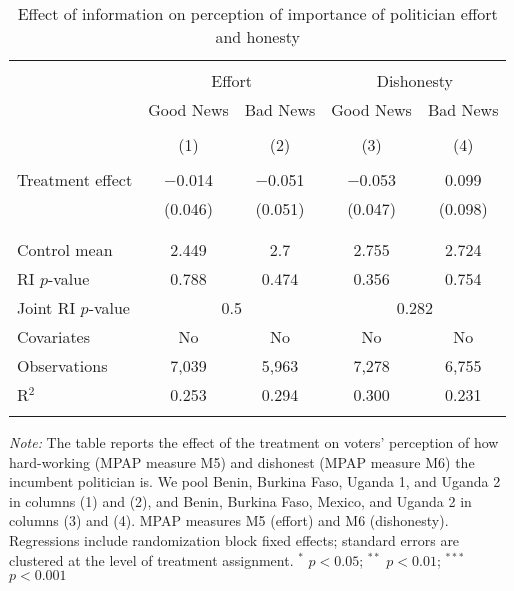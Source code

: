 
\begin{table}[!htbp] \centering 
  \caption{Effect of information on perception of importance of politician effort and honesty} 
  \label{effort_honesty} 
\begin{tabular}{@{\extracolsep{1pt}}lcccc} 
\\[-1.8ex]\hline 
\hline \\[-1.8ex] 
 & \multicolumn{2}{c}{Effort}&\multicolumn{2}{c}{Dishonesty} \\ 
\cline{2-5} 
 & Good News & Bad News & Good News & Bad News \\ 
\\[-1.8ex] & (1) & (2) & (3) & (4)\\ 
\hline \\[-1.8ex] 
 Treatment effect & $-$0.014 & $-$0.051 & $-$0.053 & 0.099 \\ 
  & (0.046) & (0.051) & (0.047) & (0.098) \\ 
  & & & & \\ 
\hline \\[-1.8ex] 
Control mean & 2.449 & 2.7 & 2.755 & 2.724 \\ 
RI $p$-value & 0.788 & 0.474 & 0.356 & 0.754 \\ 
Joint RI $p$-value & \multicolumn{2}{c}{0.5} & \multicolumn{2}{c}{0.282} \\
Covariates & No & No & No & No \\ 
Observations & 7,039 & 5,963 & 7,278 & 6,755 \\ 
R$^{2}$ & 0.253 & 0.294 & 0.300 & 0.231 \\ 
\hline 
\hline \\[-1.8ex] 
\end{tabular} 
\begin{flushleft}\textit{Note:} The table reports the effect of the treatment on voters' perception of how hard-working (MPAP measure M5) and dishonest (MPAP measure M6) the incumbent politician is. We pool Benin, Burkina Faso, Uganda 1, and Uganda 2 in columns (1) and (2), and Benin, Burkina Faso, Mexico, and Uganda 2 in columns (3) and (4). MPAP measures M5 (effort) and M6 (dishonesty). Regressions include randomization block fixed effects; standard errors are clustered at the level of treatment assignment. $^{*}$ $p<0.05$; $^{**}$ $p<0.01$; $^{***}$ $p<0.001$ \end{flushleft}
\end{table} 
